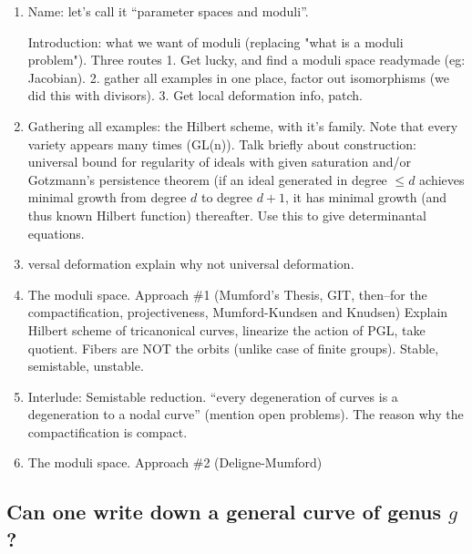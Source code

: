 \begin{enumerate}
 \item Name: let's call it ``parameter spaces and moduli''.
 
 Introduction: what we want of moduli (replacing "what is a moduli problem"). Three routes
 1. Get lucky, and find a moduli space readymade (eg: Jacobian). 2.  gather all examples in one place, factor out isomorphisms (we did this with divisors). 3. Get local deformation info, patch.
 
 \item Gathering all examples:  the Hilbert scheme, with it's family. Note that every variety appears many times (GL(n)). Talk briefly about construction: universal bound for regularity of ideals with given saturation and/or Gotzmann's persistence theorem (if an ideal generated in degree $\leq d$ achieves minimal growth
 from degree $d$ to degree $d+1$, it has minimal growth (and thus known Hilbert function) thereafter.
 Use this to give determinantal equations.
 
 \item versal deformation explain why not universal deformation.
 
 \item The moduli space. Approach \#1 (Mumford's Thesis, GIT, then--for the compactification, projectiveness, Mumford-Kundsen and Knudsen) Explain Hilbert scheme of tricanonical curves, linearize the action of PGL, take quotient. Fibers are NOT the orbits (unlike case of finite groups). Stable, semistable, unstable. 
 
 \item Interlude: Semistable reduction. ``every degeneration of curves is a degeneration to a nodal curve''
(mention open problems). The reason why the compactification is compact.

\item The moduli space. Approach \#2 (Deligne-Mumford)

\end{enumerate}


\subsection{Can one write down a general curve of genus $g$?}


